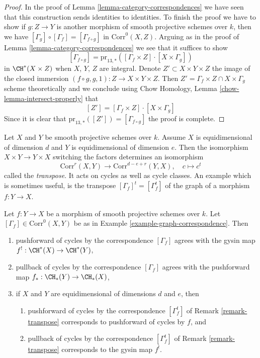 \begin{proof}
In the proof of Lemma \ref{lemma-category-correspondences}
we have seen that this construction sends identities to
identities. To finish the proof we have to show if $g : Z \to Y$
is another morphism of smooth projective schemes over $k$, then we have
$[\Gamma_g] \circ [\Gamma_f] = [\Gamma_{f \circ g}]$ in
$\text{Corr}^0(X, Z)$. Arguing as in the proof of
Lemma \ref{lemma-category-correspondences} we see that it
suffices to show
$$
[\Gamma_{f \circ g}] =
\text{pr}_{13, *}([\Gamma_f \times Z] \cdot [X \times \Gamma_g])
$$
in $\CH^*(X \times Z)$ when $X$, $Y$, $Z$ are integral.
Denote $Z' \subset X \times Y \times Z$ the image of the closed immersion
$(f \circ g, g, 1) : Z \to X \times Y \times Z$.
Then $Z' = \Gamma_f \times Z \cap X \times \Gamma_g$
scheme theoretically and we conclude using
Chow Homology, Lemma \ref{chow-lemma-intersect-properly}
that
$$
[Z'] = [\Gamma_f \times Z] \cdot [X \times \Gamma_g]
$$
Since it is clear that $\text{pr}_{13, *}([Z']) = [\Gamma_{f \circ g}]$
the proof is complete.
\end{proof}

\begin{remark}
\label{remark-transpose}
Let $X$ and $Y$ be smooth projective schemes over $k$.
Assume $X$ is equidimensional of dimension $d$ and
$Y$ is equidimensional of dimension $e$. Then the isomorphism
$X \times Y \to Y \times X$ switching the factors determines
an isomorphism
$$
\text{Corr}^r(X, Y) \longrightarrow \text{Corr}^{d - e + r}(Y, X),\quad
c \longmapsto c^t
$$
called the {\it transpose}. It acts on cycles as well as cycle classes.
An example which is sometimes useful, is the transpose
$[\Gamma_f]^t = [\Gamma_f^t]$ of the graph of a morphism $f : Y \to X$.
\end{remark}

\begin{lemma}
\label{lemma-functor-and-cycles}
Let $f : Y \to X$ be a morphism of smooth projective schemes over $k$.
Let $[\Gamma_f] \in \text{Corr}^0(X, Y)$ be as in
Example \ref{example-graph-correspondence}. Then
\begin{enumerate}
\item pushforward of cycles by the correspondence $[\Gamma_f]$
agrees with the gysin map $f^! : \CH^*(X) \to \CH^*(Y)$,
\item pullback of cycles by the correspondence $[\Gamma_f]$
agrees with the pushforward map $f_* : \CH_*(Y) \to \CH_*(X)$,
\item if $X$ and $Y$ are equidimensional of dimensions $d$ and $e$,
then
\begin{enumerate}
\item pushforward of cycles by the correspondence
$[\Gamma_f^t]$ of Remark \ref{remark-transpose}
corresponds to pushforward of cycles by $f$, and
\item pullback of cycles by the correspondence
$[\Gamma_f^t]$ of Remark \ref{remark-transpose}
corresponds to the gysin map $f^!$.
\end{enumerate}
\end{enumerate}
\end{lemma}

